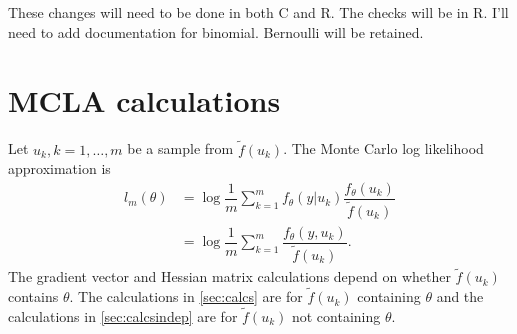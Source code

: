 \documentclass{article}
\begin{document}
These changes will need to be done in both C and R. The checks will be in R. I'll need to add  documentation for binomial. Bernoulli will be retained.

%
%
%
%
%







\appendix
\section{MCLA calculations}
Let $u_k,k=1,\ldots,m$ be a sample from $\tilde{f}(u_k)$. The Monte Carlo log likelihood approximation is
\begin{align}
l_{m}(\theta) &=\log \dfrac{1}{m} \sum_{k=1}^mf_\theta(y|u_k)  \dfrac{ f_\theta(u_k)   }{\tilde{f}(u_k)}\\
&= \log \dfrac{1}{m} \sum_{k=1}^m  \dfrac{ f_\theta(y,u_k)   }{\tilde{f}(u_k)}.
\end{align}
The gradient vector and Hessian matrix calculations depend on whether $\tilde{f}(u_k)$ contains $\theta$. The calculations in \ref{sec:calcs} are for $\tilde{f}(u_k)$ containing $\theta$ and the calculations in \ref{sec:calcsindep} are for $\tilde{f}(u_k)$ not containing $\theta$.
\end{document}
